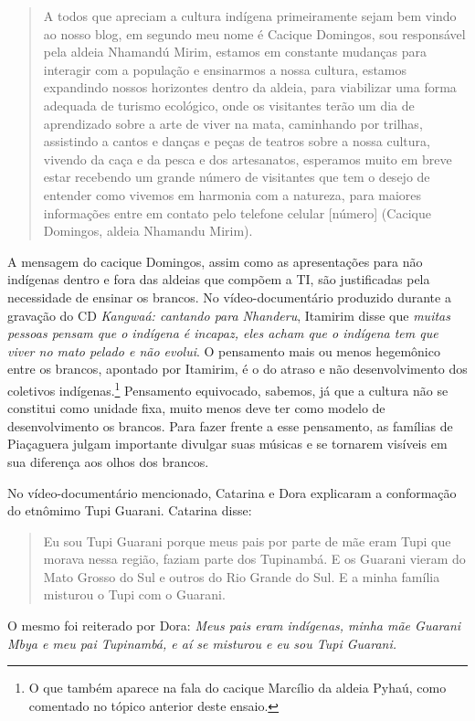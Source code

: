 \begin{quote}
A todos que apreciam a cultura indígena primeiramente sejam bem vindo ao
nosso blog, em segundo meu nome é Cacique Domingos, sou responsável pela
aldeia Nhamandú Mirim, estamos em constante mudanças para interagir com
a população e ensinarmos a nossa cultura, estamos expandindo nossos
horizontes dentro da aldeia, para viabilizar uma forma adequada de
turismo ecológico, onde os visitantes terão um dia de aprendizado sobre
a arte de viver na mata, caminhando por trilhas, assistindo a cantos e
danças e peças de teatros sobre a nossa cultura, vivendo da caça e da
pesca e dos artesanatos, esperamos muito em breve estar recebendo um
grande número de visitantes que tem o desejo de entender como vivemos em
harmonia com a natureza, para maiores informações entre em contato pelo
telefone celular {[}número{]} (Cacique Domingos, aldeia Nhamandu Mirim).
\end{quote}

A mensagem do cacique Domingos, assim como as apresentações para não
indígenas dentro e fora das aldeias que compõem a TI, são justificadas
pela necessidade de ensinar os brancos. No vídeo-documentário produzido
durante a gravação do CD \emph{Kangwaá: cantando para Nhanderu},
Itamirim disse que \emph{muitas pessoas pensam que o indígena é incapaz,
eles acham que o indígena tem que viver no mato pelado e não evolui}. O
pensamento mais ou menos hegemônico entre os brancos, apontado por
Itamirim, é o do atraso e não desenvolvimento dos coletivos
indígenas.\footnote{O que também aparece na fala do cacique Marcílio da
  aldeia Pyhaú, como comentado no tópico anterior deste ensaio.}
Pensamento equivocado, sabemos, já que a cultura não se constitui como
unidade fixa, muito menos deve ter como modelo de desenvolvimento os
brancos. Para fazer frente a esse pensamento, as famílias de Piaçaguera
julgam importante divulgar suas músicas e se tornarem visíveis em sua
diferença aos olhos dos brancos.

No vídeo-documentário mencionado, Catarina e Dora explicaram a
conformação do etnômimo Tupi Guarani. Catarina disse:

\begin{quote}
Eu sou Tupi Guarani porque meus pais por parte de mãe eram Tupi que
morava nessa região, faziam parte dos Tupinambá. E os Guarani vieram do
Mato Grosso do Sul e outros do Rio Grande do Sul. E a minha família
misturou o Tupi com o Guarani.
\end{quote}

O mesmo foi reiterado por Dora: \emph{Meus pais eram indígenas, minha
mãe Guarani Mbya e meu pai Tupinambá, e aí se misturou e eu sou Tupi
Guarani.}

